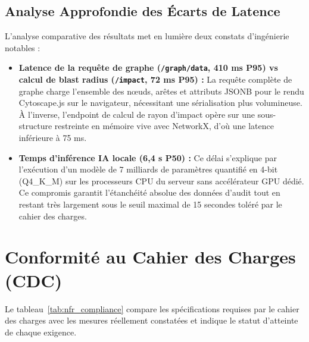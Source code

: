 \subsection{Analyse Approfondie des \'Ecarts de Latence}
\par L'analyse comparative des r\'esultats met en lumi\`ere deux constats d'ing\'enierie notables :
\begin{itemize}
    \item \textbf{Latence de la requ\^ete de graphe (\texttt{/graph/data}, 410 ms P95) vs calcul de blast radius (\texttt{/impact}, 72 ms P95) :} La requ\^ete compl\`ete de graphe charge l'ensemble des n\oe uds, ar\^etes et attributs JSONB pour le rendu Cytoscape.js sur le navigateur, n\'ecessitant une s\'erialisation plus volumineuse. \`A l'inverse, l'endpoint de calcul de rayon d'impact op\`ere sur une sous-structure restreinte en m\'emoire vive avec NetworkX, d'o\`u une latence inf\'erieure \`a 75 ms.
    \item \textbf{Temps d'inf\'erence IA locale (6,4 s P50) :} Ce d\'elai s'explique par l'ex\'ecution d'un mod\`ele de 7 milliards de param\`etres quantifi\'e en 4-bit (Q4\_K\_M) sur les processeurs CPU du serveur sans acc\'el\'erateur GPU d\'edi\'e. Ce compromis garantit l'\'etanch\'eit\'e absolue des donn\'ees d'audit tout en restant tr\`es largement sous le seuil maximal de 15 secondes tol\'er\'e par le cahier des charges.
\end{itemize}

\section{Conformit\'e au Cahier des Charges (CDC)}
\par Le tableau~\ref{tab:nfr_compliance} compare les sp\'ecifications requises par le cahier des charges avec les mesures r\'eellement constat\'ees et indique le statut d'atteinte de chaque exigence.


